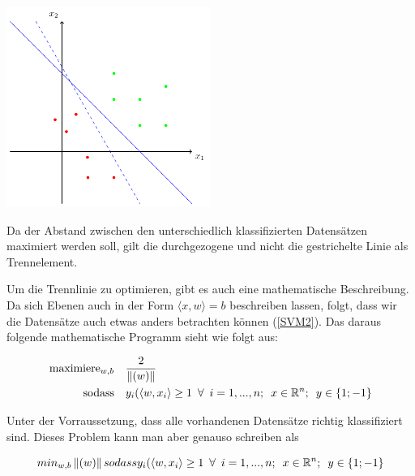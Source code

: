 \begin{dsafigure}
	\begin{center}
		\includegraphics[width=0.5\textwidth]{Figure_SimpleSVM}
		\caption{Da der Abstand zwischen den unterschiedlich klassifizierten Datensätzen maximiert werden soll, gilt die durchgezogene und nicht die gestrichelte Linie als Trennelement.}
		\label{FigSimpleSVM}
	\end{center}
\end{dsafigure}

Um die Trennlinie zu optimieren, gibt es auch eine mathematische Beschreibung. Da sich Ebenen auch in der Form $\langle x, w \rangle = b $ beschreiben lassen, folgt, dass wir die Datensätze auch etwas anders betrachten können (\ref{SVM2}). %
Das daraus folgende mathematische Programm sieht wie folgt aus: 

\begin{align*}
	\operatorname{maximiere}_{w,b} &\quad\frac{2}{\norm{(w)}} \\
	\operatorname{sodass} &\quad y_{i}(\langle w,x_{i} \rangle \geq 1 \hspace{5pt} \forall \hspace{5pt} i = 1,...,n ;  \hspace{5pt} x \in \mathbb{R}^n; \hspace{5pt} 	y \in \{1; -1\}
	 \label{SVM-ProblemMax}
\end{align*}

Unter der Vorraussetzung, dass alle vorhandenen Datensätze richtig klassifiziert sind. Dieses Problem kann 
man aber genauso schreiben als 

\begin{equation*}
		min_{w,b} \norm{(w)} \\
		sodass y_{i}(\langle w,x_{i} \rangle \geq 1 \hspace{5pt} \forall \hspace{5pt} i = 1,...,n ;\hspace{5pt} x \in \mathbb{R}^n; \hspace{5pt} 	y \in \{1; -1\}
		\label{SVM-ProblemMin}
\end{equation*}

